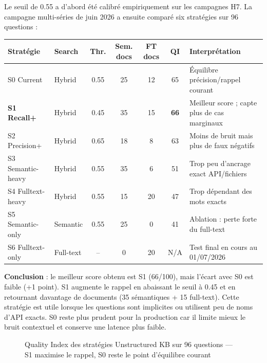 Le seuil de 0.55 a d'abord été calibré empiriquement sur les campagnes H7. La campagne multi-séries de juin 2026 a ensuite comparé six stratégies sur 96 questions :

\begin{longtable}{p{2cm}p{2cm}ccccp{4.3cm}}
\toprule
\textbf{Stratégie} & \textbf{Search} & \textbf{Thr.} & \textbf{Sem. docs} & \textbf{FT docs} & \textbf{QI} & \textbf{Interprétation} \\
\midrule
S0 Current & Hybrid & 0.55 & 25 & 12 & 65 & Équilibre précision/rappel courant \\
\textbf{S1 Recall+} & Hybrid & 0.45 & 35 & 15 & \textbf{66} & Meilleur score ; capte plus de cas marginaux \\
S2 Precision+ & Hybrid & 0.65 & 18 & 8 & 63 & Moins de bruit mais plus de faux négatifs \\
S3 Semantic-heavy & Hybrid & 0.55 & 35 & 6 & 51 & Trop peu d'ancrage exact API/fichiers \\
S4 Fulltext-heavy & Hybrid & 0.55 & 15 & 20 & 47 & Trop dépendant des mots exacts \\
S5 Semantic-only & Semantic & 0.55 & 25 & 0 & 41 & Ablation : perte forte du full-text \\
S6 Fulltext-only & Full-text & -- & 0 & 20 & N/A & Test final en cours au 01/07/2026 \\
\bottomrule
\end{longtable}

\textbf{Conclusion} : le meilleur score obtenu est S1 (66/100), mais l'écart avec S0 est faible (+1 point). S1 augmente le rappel en abaissant le seuil à 0.45 et en retournant davantage de documents (35 sémantiques + 15 full-text). Cette stratégie est utile lorsque les questions sont implicites ou utilisent peu de noms d'API exacts. S0 reste plus prudent pour la production car il limite mieux le bruit contextuel et conserve une latence plus faible.

\begin{figure}[H]
\centering
{}
\caption{Quality Index des stratégies Unstructured KB sur 96 questions --- S1 maximise le rappel, S0 reste le point d'équilibre courant}
\label{fig:kb_strategy_qi}
\end{figure}

